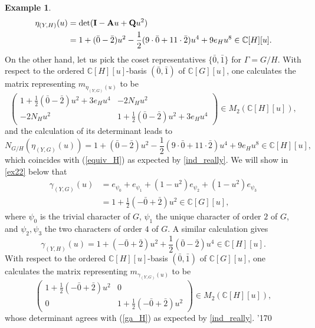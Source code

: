 \documentclass[11pt]{amsart}
\numberwithin{equation}{section}
\theoremstyle{remark}
\theoremstyle{definition}
\newtheorem{example}[theorem]{Example}
\newcommand\xqed[1]{%
  \leavevmode\unskip\penalty9999 \hbox{}\nobreak\hfill
  \quad\hbox{#1}}
\newcommand\demo{\xqed{\manual\char'170}}
\begin{document}
\begin{example}
\begin{equation}
\begin{aligned}
\eta_{(Y,H)}(u) &= {\rm det}(\mathbf{I} - \mathbf{A}u + \mathbf{Q}u^{2}) \\
&= 1 + (\bar{0}-\bar{2})u^{2} - \frac{1}{2}(9\cdot \bar{0} + 11\cdot \bar{2})u^{4} + 9e_{H}u^{8} \in \mathbb{C}[H][u]. 
\end{aligned}
\end{equation}
On the other hand, let us pick the coset representatives $\{\bar{0},\bar{1}\}$ for $\Gamma = G/H$.  With respect to the ordered $\mathbb{C}[H][u]$-basis $(\bar{0},\bar{1})$ of $\mathbb{C}[G][u]$, one calculates the matrix representing $m_{\eta_{(Y,G)}(u)}$ to be
\begin{equation*}
\begin{pmatrix}
1 + \frac{1}{2}(\bar{0} - \bar{2})u^{2} + 3 e_{H}u^{4} & -2 N_{H}u^{2} \\
-2 N_{H} u^{2} & 1 + \frac{1}{2}(\bar{0} - \bar{2})u^{2} + 3 e_{H}u^{4}
\end{pmatrix} \in M_{2}(\mathbb{C}[H][u]),
\end{equation*}
and the calculation of its determinant leads to
$$N_{G/H}(\eta_{(Y,G)}(u)) = 1 + (\bar{0}-\bar{2})u^{2} - \frac{1}{2}(9\cdot \bar{0} + 11\cdot \bar{2})u^{4} + 9e_{H}u^{8} \in \mathbb{C}[H][u], $$
which coincides with (\ref{equiv_H}) as expected by \cref{ind_really}.  We will show in \cref{ex22} below that
\begin{equation*} 
\begin{aligned}
\gamma_{(Y,G)}(u) &= e_{\psi_{0}} + e_{\psi_{1}} + (1-u^{2})e_{\psi_{2}} + (1-u^{2})e_{\psi_{3}} \\
&= 1 + \frac{1}{2}(-\bar{0} + \bar{2})u^{2} \in \mathbb{C}[G][u],
\end{aligned}
\end{equation*}
where $\psi_{0}$ is the trivial character of $G$, $\psi_{1}$ the unique character of order $2$ of $G$, and $\psi_{2}, \psi_{3}$ the two characters of order $4$ of $G$.  A similar calculation gives 
\begin{equation} \label{ga_H}
\gamma_{(Y,H)}(u) = 1 + (-\bar{0} + \bar{2})u^{2} + \frac{1}{2}(\bar{0}-\bar{2})u^{4} \in \mathbb{C}[H][u]. 
\end{equation}
With respect to the ordered $\mathbb{C}[H][u]$-basis $(\bar{0},\bar{1})$ of $\mathbb{C}[G][u]$, one calculates the matrix representing $m_{\gamma_{(Y,G)}(u)}$ to be
\begin{equation*}
\begin{pmatrix}
1 + \frac{1}{2}(-\bar{0} + \bar{2})u^{2} & 0 \\
0 & 1 + \frac{1}{2}(-\bar{0} + \bar{2})u^{2}
\end{pmatrix} \in M_{2}(\mathbb{C}[H][u]),
\end{equation*}
whose determinant agrees with (\ref{ga_H}) as expected by \cref{ind_really}.
\demo
\end{example}
\end{document}
